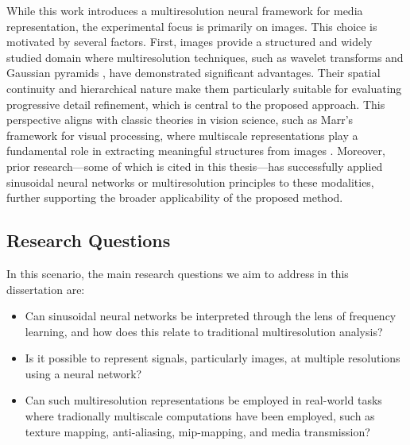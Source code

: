 While this work introduces a multiresolution neural framework for media representation, the experimental focus is primarily on images. This choice is motivated by several factors. First, images provide a structured and widely studied domain where multiresolution techniques, such as wavelet transforms \citep{wavelet1984, mallat1989theory} and Gaussian pyramids \citep{burt1983laplacian}, have demonstrated significant advantages. Their spatial continuity and hierarchical nature make them particularly suitable for evaluating progressive detail refinement, which is central to the proposed approach. This perspective aligns with classic theories in vision science, such as Marr's framework for visual processing, where multiscale representations play a fundamental role in extracting meaningful structures from images \citep{marr82}. Moreover, prior research—some of which is cited in this thesis—has successfully applied sinusoidal neural networks \citep{sitzmann2019siren} or multiresolution principles \citep{bacon2021} to these modalities, further supporting the broader applicability of the proposed method.




\subsection{Research Questions}

In this scenario, the main research questions we aim to address in this dissertation are:

\begin{itemize}
    \item Can sinusoidal neural networks be interpreted through the lens of frequency learning, and how does this relate to traditional multiresolution analysis? 
    \item Is it possible to represent signals, particularly images, at multiple resolutions using a neural network?
    \item Can such multiresolution representations be employed in real-world tasks where tradionally multiscale computations have been employed, such as texture mapping, anti-aliasing, mip-mapping, and media transmission?
\end{itemize}  
  
